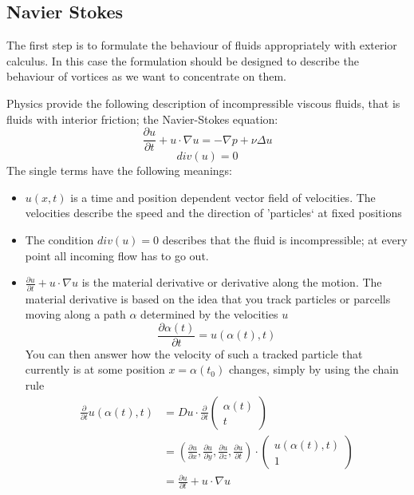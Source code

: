 \subsection{Navier Stokes}
The first step is to formulate the behaviour of fluids appropriately with exterior calculus. In this case the formulation should be designed to describe the behaviour of vortices as we want to concentrate on them.

Physics provide the following description of incompressible viscous fluids, that is fluids with interior friction; the Navier-Stokes equation:
\[\frac{\partial u}{\partial t} + u \cdot \nabla u = -\nabla p + \nu \Delta u\]
\begin{equation}div(u) = 0\label{eq:NS}\end{equation} 
The single terms have the following meanings:
\begin{itemize}
	\item $u(x,t)$ is a time and position dependent vector field of velocities. The velocities describe the speed and the direction of 'particles` at fixed positions
	\item The condition $div(u) = 0$ describes that the fluid is incompressible; at every point all incoming flow has to go out.
	\item $\frac{\partial u}{\partial t} + u \cdot \nabla u$ is the material derivative or derivative along the motion. The material derivative is based on the idea that you track particles or parcells moving along a path $\alpha$ determined by the velocities $u$
	\[\frac{\partial \alpha(t)}{\partial t} = u(\alpha(t), t)\]
	You can then answer how the velocity of such a tracked particle that currently is at some position $x = \alpha(t_0)$ changes, simply by using the chain rule 
	\begin{align*}\frac{\partial}{\partial t} u(\alpha(t),t) &= Du \cdot \frac{\partial}{\partial t}\begin{pmatrix}
	\alpha(t) \\
	t
	\end{pmatrix}\\
	&= (\frac{\partial u}{\partial x}, \frac{\partial u}{\partial y},\frac{\partial u}{\partial z}, \frac{\partial u}{\partial t}) \cdot \begin{pmatrix}
	u(\alpha(t),t) \\
	1
	\end{pmatrix} \\
	&= \frac{\partial u}{\partial t} + u \cdot \nabla u

\end{align*}
\end{itemize}

